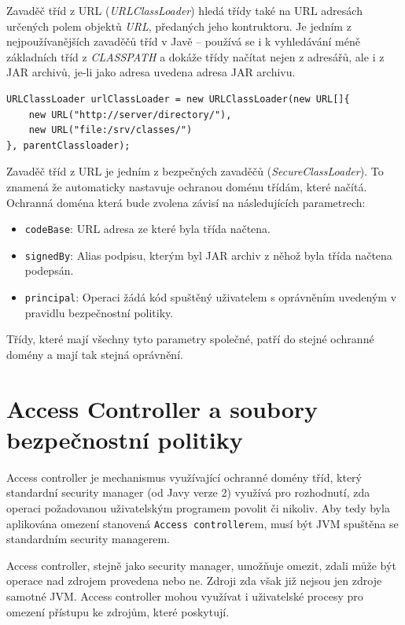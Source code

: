 Zavaděč tříd z URL ({\it URLClassLoader}) hledá třídy také na URL adresách určených polem objektů {\it URL}, předaných jeho kontruktoru. Je jedním z nejpoužívanějších zavaděčů tříd v Javě -- používá se i k vyhledávání méně základních tříd z {\it CLASSPATH} a dokáže třídy načítat nejen z adresářů, ale i z JAR archivů, je-li jako adresa uvedena adresa JAR archivu. \cite[3.2.5]{oaks}

\begin{verbatim}
URLClassLoader urlClassLoader = new URLClassLoader(new URL[]{
    new URL("http://server/directory/"),
    new URL("file:/srv/classes/")
}, parentClassloader);
\end{verbatim}

Zavaděč tříd z URL je jedním z bezpečných zavaděčů ({\it SecureClassLoader}). To znamená že automaticky nastavuje ochranou doménu třídám, které načítá.
Ochranná doména která bude zvolena závisí na následujících parametrech: \cite{refPolicyFiles}

\begin{itemize}
  \item {\tt codeBase}: URL adresa ze které byla třída načtena.
  \item {\tt signedBy}: Alias podpisu, kterým byl JAR archiv z něhož byla třída načtena podepsán.
  \item {\tt principal}: Operaci žádá kód spuštěný uživatelem s oprávněním uvedeným v pravidlu bezpečnostní politiky.
\end{itemize}

Třídy, které mají všechny tyto parametry společné, patří do stejné ochranné domény a mají tak stejná oprávnění.

\section{Access Controller a soubory bezpečnostní politiky}

Access controller je mechanismus využívající ochranné domény tříd, který standardní security manager (od Javy verze 2) využívá pro rozhodnutí, zda operaci požadovanou uživatelským programem povolit či nikoliv. Aby tedy byla aplikována omezení stanovená {\tt Access controller}em, musí být JVM spuštěna se standardním security managerem. \cite[5]{oaks}

Access controller, stejně jako security manager, umožňuje omezit, zdali může být operace nad zdrojem provedena nebo ne. Zdroji zda však již nejsou jen zdroje samotné JVM. Access controller mohou využívat i uživatelské procesy pro omezení přístupu ke zdrojům, které poskytují. \cite[5]{oaks}

